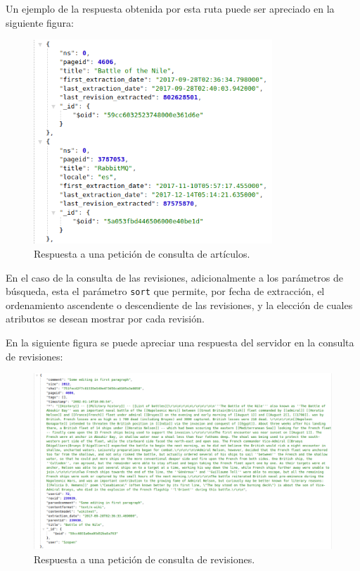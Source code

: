 Un ejemplo de la respuesta obtenida por esta ruta puede ser apreciado en la siguiente figura:

\begin{figure}[H]
	\centering
		\includegraphics[width=0.8\textwidth]{figures/response_articles}
	\caption{Respuesta a una petición de consulta de artículos.}
	\label{fig:response_articles}
\end{figure}

En el caso de la consulta de las revisiones, adicionalmente a los parámetros de búsqueda, esta el parámetro \texttt{sort} que permite, por fecha de extracción, el
ordenamiento ascendente o descendiente de las revisiones, y la elección de cuales
atributos se desean mostrar por cada revisión.

En la siguiente figura se puede apreciar una respuesta del servidor en la consulta de
revisiones:

\begin{figure}[H]
	\centering
		\includegraphics[width=1\textwidth]{figures/response_revisions}
	\caption{Respuesta a una petición de consulta de revisiones.}
	\label{fig:response_revisions}
\end{figure}

